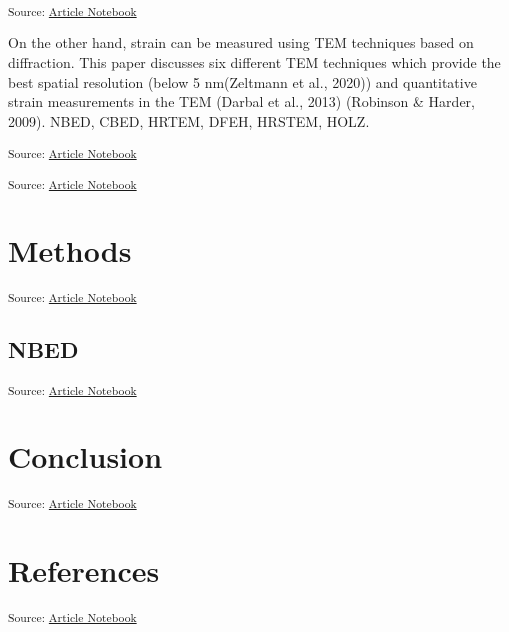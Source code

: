 \documentclass[
]{agujournal2019}
\begin{document}
\textsubscript{Source:
\href{https://radinrahimi1998.github.io/project-thesis/index.ipynb.html}{Article
Notebook}}

On the other hand, strain can be measured using TEM techniques based on
diffraction. This paper discusses six different TEM techniques which
provide the best spatial resolution (below 5 nm(Zeltmann et al., 2020))
and quantitative strain measurements in the TEM (Darbal et al., 2013)
(Robinson \& Harder, 2009). NBED, CBED, HRTEM, DFEH, HRSTEM, HOLZ.

\textsubscript{Source:
\href{https://radinrahimi1998.github.io/project-thesis/index.ipynb.html}{Article
Notebook}}

\textsubscript{Source:
\href{https://radinrahimi1998.github.io/project-thesis/index.ipynb.html}{Article
Notebook}}

\section{Methods}\label{sec-methods}

\textsubscript{Source:
\href{https://radinrahimi1998.github.io/project-thesis/index.ipynb.html}{Article
Notebook}}

\subsection{NBED}\label{nbed}

\textsubscript{Source:
\href{https://radinrahimi1998.github.io/project-thesis/index.ipynb.html}{Article
Notebook}}

\section{Conclusion}\label{conclusion}

\textsubscript{Source:
\href{https://radinrahimi1998.github.io/project-thesis/index.ipynb.html}{Article
Notebook}}

\section*{References}\label{references}

\vspace{1em}

\textsubscript{Source:
\href{https://radinrahimi1998.github.io/project-thesis/index.ipynb.html}{Article
Notebook}}
\end{document}
